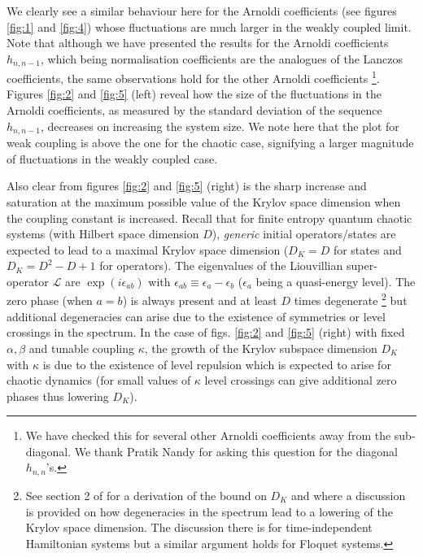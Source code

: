 \documentclass[a4paper,12pt]{article}
\begin{document}
We clearly see a similar behaviour here for the Arnoldi coefficients (see figures \ref{fig:1} and \ref{fig:4}) whose fluctuations are much larger in the weakly coupled limit. Note that although we have presented the results for the Arnoldi coefficients $h_{n,n-1}$, which being normalisation coefficients are the analogues of the Lanczos coefficients, the same observations hold for the other Arnoldi coefficients \footnote{We have checked this for several other Arnoldi coefficients away from the sub-diagonal. We thank Pratik Nandy for asking this question for the diagonal $h_{n,n}$'s.}. Figures \ref{fig:2} and \ref{fig:5} (left) reveal how the size of the fluctuations in the Arnoldi coefficients, as measured by the standard deviation of the sequence $h_{n,n-1}$, decreases on increasing the system size. We note here that the plot for weak coupling is above the one for the chaotic case, signifying a larger magnitude of fluctuations in the weakly coupled case.

Also clear from figures \ref{fig:2} and \ref{fig:5} (right) is the sharp increase and saturation at the maximum possible value of the Krylov space dimension when the coupling constant is increased. Recall that for finite entropy quantum chaotic systems (with Hilbert space dimension $D$), \textit{generic} initial operators/states are expected to lead to a maximal Krylov space dimension ($D_K=D$ for states and $D_K=D^ 2-D+1$ for operators). The eigenvalues of the Liouvillian super-operator $\mathcal{L}$ are $\exp (i\epsilon_{ab})$ with $\epsilon_{ab} \equiv \epsilon_a - \epsilon_b$ ($\epsilon_a$ being a quasi-energy level). The zero phase (when $a=b$)
is always present and at least $D$ times degenerate \footnote{See section 2 of \cite{Rabinovici_2021} for a derivation of the bound on $D_K$ and where a discussion is provided on how
degeneracies in the spectrum lead to a lowering of the Krylov space dimension. The discussion there is for time-independent Hamiltonian systems but a similar argument holds for Floquet systems.} but additional degeneracies can arise due to the existence of symmetries or level crossings in the spectrum. In the case of figs. \ref{fig:2} and \ref{fig:5} (right) with fixed $\alpha, \beta$ and tunable coupling $\kappa$, the growth of the Krylov subspace dimension $D_K$ with $\kappa$ is due to the existence of level repulsion which is expected to arise for chaotic dynamics (for small values of $\kappa$  level crossings can give additional zero phases thus lowering $D_K$).
\end{document}
